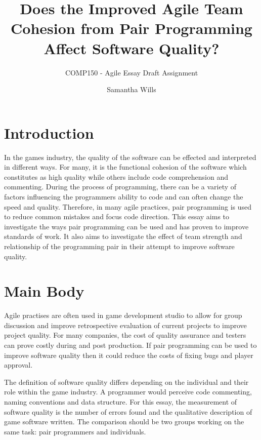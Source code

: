 \documentclass{scrartcl}
\title{Does the Improved Agile Team Cohesion from Pair Programming Affect Software Quality?}
\subtitle{COMP150 - Agile Essay Draft Assignment}
\author{Samantha Wills}
\begin{document}
\maketitle

\section*{Introduction}
In the games industry, the quality of the software can be effected and interpreted in different ways. For many, it is the functional cohesion of the software which constitutes as high quality while others include code comprehension and commenting. During the process of programming, there can be a variety of factors influencing the programmers ability to code and can often change the speed and quality. Therefore, in many agile practices, pair programming is used to reduce common mistakes and focus code direction. This essay aims to investigate the ways pair programming can be used and has proven to improve standards of work. It also aims to investigate the effect of team strength and relationship of the programming pair in their attempt to improve software quality.

\section*{Main Body}
Agile practises are often used in game development studio to allow for group discussion and improve retrospective evaluation of current projects to improve project quality. For many companies, the cost of quality assurance and testers can prove costly during and post production. If pair programming can be used to improve software quality then it could reduce the costs of fixing bugs and player approval.

The definition of software quality differs depending on the individual and their role within the game industry. A programmer would perceive code commenting, naming conventions and data structure. For this essay, the measurement of software quality is the number of errors found and the qualitative description of game software written. The comparison should be two groups working on the same task: pair programmers and individuals.





\end{document}
